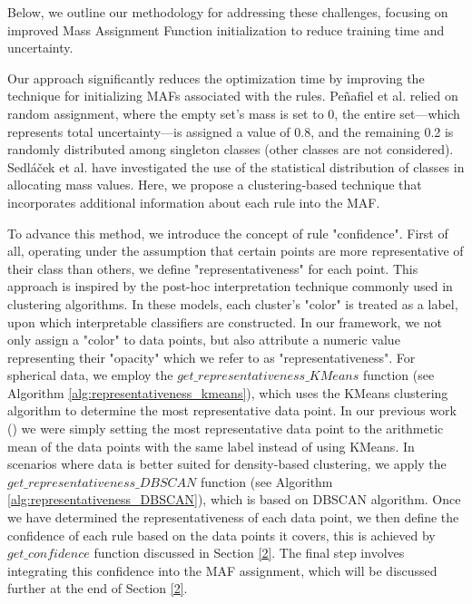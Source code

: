 \documentclass[10pt,a4paper,oneside]{article}
\begin{document}
{\color{black}Below, we outline our methodology for addressing these challenges, focusing on improved Mass Assignment Function initialization to reduce training time and uncertainty.}

Our approach significantly reduces the optimization time by improving the technique for initializing MAFs associated with the rules. Peñafiel et al. \cite{sergio} relied on random assignment, where the empty set's mass is set to 0, the entire set—which represents total uncertainty—is assigned a value of 0.8, and the remaining 0.2 is randomly distributed among singleton classes (other classes are not considered). {\color{black} Sedláček et al. \cite{czechs} have investigated the use of the statistical distribution of classes in allocating mass values}. Here{\color{black},} we propose a {\color{black} clustering-based} technique that incorporates additional information about each rule into the MAF. 

To advance this method, we introduce the concept of rule "confidence". First of all, operating under the assumption that certain points are more representative of their class than others{\color{black},} we define "representativeness" for each point. This approach is inspired by the post-hoc interpretation technique commonly used in clustering algorithms. In these models, each cluster's "color" is treated as a label, upon which interpretable classifiers are constructed. In our framework, we not only assign a "color" to data points{\color{black},} but also attribute a numeric value representing their "opacity" which we refer to as "representativeness". For spherical data, we employ the $get\_representativeness\_KMeans$ function (see Algorithm \ref{alg:representativeness_kmeans}), which uses the KMeans clustering algorithm \cite{kmeans} to determine the most representative data point. {\color{black}In our previous work (\cite{menq}) we were simply setting the most representative data point to the arithmetic mean of the data points with the same label instead of using KMeans.} In scenarios where data is better suited for density-based clustering, we apply the $get\_representativeness\_DBSCAN$ function (see Algorithm \ref{alg:representativeness_DBSCAN}), {\color{black}which is based on DBSCAN \cite{DBSCAN} algorithm.} Once we have determined the representativeness of each data point, we then define the confidence of each rule based on the data points it covers, this is achieved by $get\_confidence$ function discussed in Section \ref{2}. The final step involves integrating this confidence into the MAF assignment, which will be discussed further at the end of Section \ref{2}.
\end{document}

